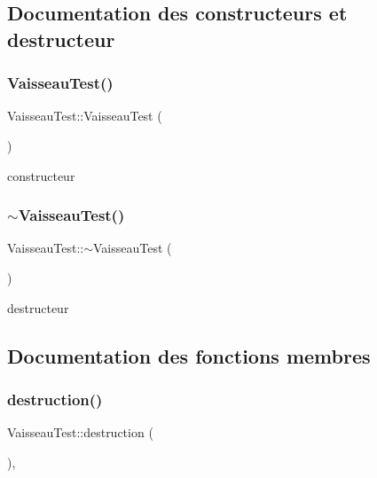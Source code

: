 \subsection{Documentation des constructeurs et destructeur}
\mbox{\label{class_vaisseau_test_acbe01fc8952d9c6fd52cbf311a92c903}} 
\subsubsection{\texorpdfstring{Vaisseau\+Test()}{VaisseauTest()}}
{\footnotesize\ttfamily Vaisseau\+Test\+::\+Vaisseau\+Test (\begin{DoxyParamCaption}{ }\end{DoxyParamCaption})}



constructeur 

\mbox{\label{class_vaisseau_test_ada9b5788bc092ecede953248cd6133e8}} 
\subsubsection{\texorpdfstring{$\sim$\+Vaisseau\+Test()}{~VaisseauTest()}}
{\footnotesize\ttfamily Vaisseau\+Test\+::$\sim$\+Vaisseau\+Test (\begin{DoxyParamCaption}{ }\end{DoxyParamCaption})}



destructeur 



\subsection{Documentation des fonctions membres}
\mbox{\label{class_vaisseau_test_a5b8b67886ecb73d8f720f8499ef3c378}} 
\subsubsection{\texorpdfstring{destruction()}{destruction()}}
{\footnotesize\ttfamily Vaisseau\+Test\+::destruction (\begin{DoxyParamCaption}{ }\end{DoxyParamCaption})\hspace{0.3cm}{\ttfamily [inline]}, {\ttfamily [virtual]}}




